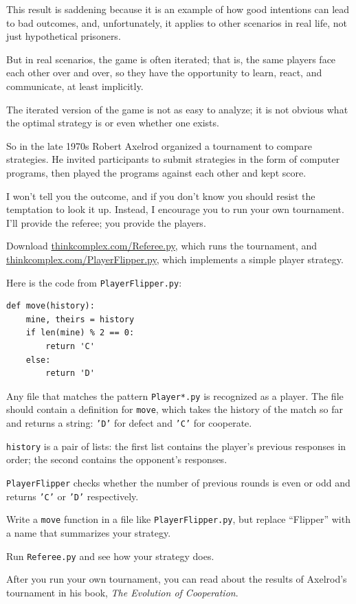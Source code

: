 \documentclass[10pt]{book}
\begin{document}
This result is saddening because it is an example of how good intentions
can lead to bad outcomes, and, unfortunately, it applies to other
scenarios in real life, not just hypothetical prisoners.

But in real scenarios, the game is often iterated; that is, the same
players face each other over and over, so they have the opportunity
to learn, react, and communicate, at least implicitly.

The iterated version of the game is not as easy to analyze; it
is not obvious what the optimal strategy is or even whether one
exists.

So in the late 1970s Robert Axelrod organized a tournament to compare
strategies.  He invited participants to submit strategies in the
form of computer programs, then played the programs against each other
and kept score.

I won't tell you the outcome, and if you don't know you should resist
the temptation to look it up.  Instead, I encourage you to run your
own tournament.  I'll provide the referee; you provide the players.

\begin{exercise}

Download \url{thinkcomplex.com/Referee.py}, which runs the tournament,
and \url{thinkcomplex.com/PlayerFlipper.py}, which implements a simple
player strategy.

Here is the code from {\tt PlayerFlipper.py}:

\begin{verbatim}
def move(history):
    mine, theirs = history
    if len(mine) % 2 == 0:
        return 'C'
    else:
        return 'D'
\end{verbatim}

Any file that matches the pattern {\tt Player*.py} is recognized
as a player.  The file should contain a definition for {\tt move},
which takes the history of the match so far and returns a string:
{\tt 'D'} for defect and {\tt 'C'} for cooperate.

{\tt history} is a pair of lists: the first list contains the
player's previous responses in order; the second contains the
opponent's responses.

{\tt PlayerFlipper} checks whether the number of previous rounds
is even or odd and returns {\tt 'C'} or {\tt 'D'} respectively.

Write a {\tt move} function in a file like {\tt PlayerFlipper.py}, but
replace ``Flipper'' with a name that summarizes your strategy.

Run {\tt Referee.py} and see how your strategy does.

After you run your own tournament, you can read about the results
of Axelrod's tournament in his book, {\it The Evolution of Cooperation}.
\end{exercise}
\end{document}
